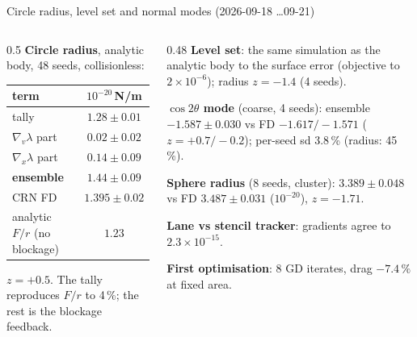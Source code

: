 \documentclass[10pt,aspectratio=169]{beamer}
\begin{document}
\begin{frame}{Circle radius, level set and normal modes (2026-09-18 \dots 09-21)}
\footnotesize
\begin{columns}[T]
\begin{column}{0.5\textwidth}
\textbf{Circle radius}, analytic body, 48 seeds, collisionless:
\begin{center}
\begin{tabular}{@{}lc@{}}
\toprule
term & $10^{-20}$\,N/m\\
\midrule
tally & $1.28\pm0.01$\\
$\nabla_v\lambda$ part & $0.02\pm0.02$\\
$\nabla_x\lambda$ part & $0.14\pm0.09$\\
\textbf{ensemble} & $1.44\pm0.09$\\
CRN FD & $1.395\pm0.02$\\
analytic $F/r$ (no blockage) & $1.23$\\
\bottomrule
\end{tabular}
\end{center}
$z = +0.5$.  The tally reproduces $F/r$ to 4\,\%; the rest is the blockage feedback.
\end{column}
\begin{column}{0.48\textwidth}
\textbf{Level set}: the same simulation as the analytic body to the surface error (objective to
$2\times10^{-6}$); radius $z = -1.4$ (4 seeds).

\textbf{$\cos2\theta$ mode} (coarse, 4 seeds): ensemble $-1.587\pm0.030$ vs FD $-1.617 / -1.571$
($z = +0.7 / -0.2$); per-seed sd 3.8\,\% (radius: 45\,\%).

\textbf{Sphere radius} (8 seeds, cluster): $3.389\pm0.048$ vs FD $3.487\pm0.031$ ($10^{-20}$), $z = -1.71$.

\textbf{Lane vs stencil tracker}: gradients agree to $2.3\times10^{-15}$.

\textbf{First optimisation}: 8 GD iterates, drag $-7.4\,\%$ at fixed area.
\end{column}
\end{columns}
\end{frame}
\end{document}
